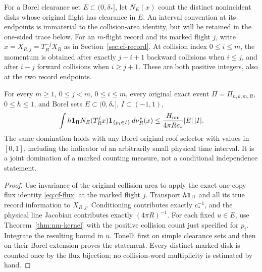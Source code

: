 For a Borel clearance set $E\subset(0,\delta_*]$, let $N_E(x)$
count the distinct nonincident disks whose original flight has
clearance in $E$.  An interval convention at its endpoints is
immaterial to the collision-area identity, but will be retained in
the one-sided trace below.  For an $m$-flight record and its marked
flight $j$, write $x=X_{R,j}=T_R^{-j}X_R$ as in
Section~\ref{sec:cf-record}.  At collision index $0\le i\le m$,
the momentum is obtained after exactly $j-i+1$ backward collisions
when $i\le j$, and after $i-j$ forward collisions when $i\ge j+1$.
These are both positive integers, also at the two record endpoints.

\begin{corollary}
\label{cor:nm-joint}
For every $m\ge1$, $0\le j<m$, $0\le i\le m$, every original
exact event $\Pi=\Pi_{n,k,m,R}$, $0\le h\le1$, and Borel sets
$E\subset(0,\delta_*]$, $I\subset(-1,1)$,
\begin{equation}\label{eq:nm-joint}
 \int h\mathbf1_\Pi N_E(T_R^jx)\mathbf1_{\{p_i\in I\}}\,d\nu_R^*(x)
             \le\frac{H_{\rm nm}}{4\pi R c_*}|E|\,|I|.
\end{equation}
The same domination holds with any Borel original-roof selector
with values in $[0,1]$, including the indicator of an arbitrarily
small physical time interval.
It is a joint domination of a marked counting measure, not a
conditional independence statement.
\end{corollary}
\begin{proof}
Use invariance of the original collision area to apply the exact
one-copy flux identity \eqref{eq:cf-flux} at the marked flight
$j$.  Transport $h\mathbf1_\Pi$ and all its true record information
to $X_{R,j}$.  Conditioning contributes exactly $c_*^{-1}$, and
the physical line Jacobian contributes exactly $(4\pi R)^{-1}$.
For each fixed $u\in E$, use Theorem~\ref{thm:nm-kernel} with
the positive collision count just specified for $p_i$.  Integrate
the resulting bound in $u$.  Tonelli first on simple clearance
sets and then on their Borel extension proves the statement.
Every distinct marked disk is counted once by the flux bijection;
no collision-word multiplicity is estimated by hand.
\end{proof}

